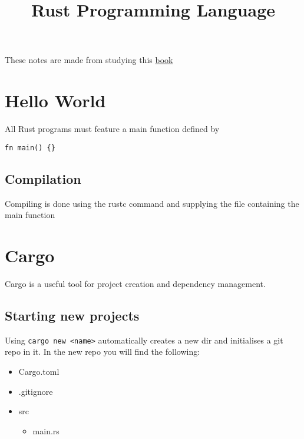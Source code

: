 \documentclass[12pt,notitlepage]{article}
\begin{document}
\title{Rust Programming Language}
\author{}
\date{}
\maketitle


These notes are made from studying this
\href{https://doc.rust-lang.org/book/title-page.html}{book} 

\section{Hello World}

All Rust programs must feature a main function defined by

\begin{lstlisting}
fn main() {}
\end{lstlisting}


\subsection{Compilation}

Compiling is done using the rustc command and supplying the file containing the
main function

\section{Cargo}

Cargo is a useful tool for project creation and dependency management.

\subsection{Starting new projects}

Using \lstinline{cargo new <name>} automatically creates a new dir and
initialises a git repo in it. In the new repo you will find the following:

\begin{itemize}
    \item Cargo.toml
    \item .gitignore
    \item src
        \begin{itemize}
            \item main.rs
        \end{itemize}
\end{itemize}
\end{document}
